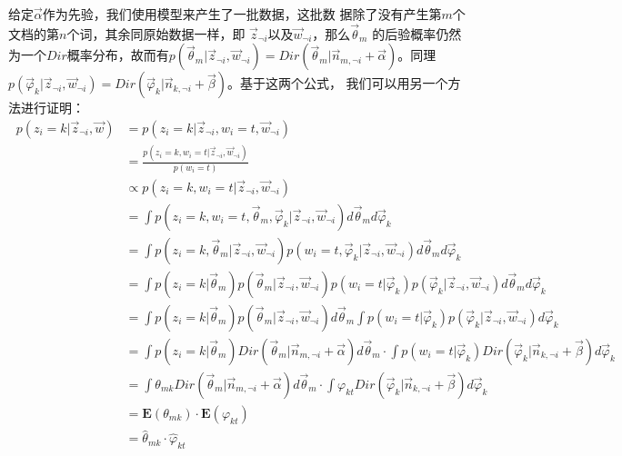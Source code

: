 给定$\vec{\alpha}$作为先验，我们使用模型来产生了一批数据，这批数
据除了没有产生第$m$个文档的第$n$个词，其余同原始数据一样，即
$\vec{z}_{\neg i}$以及$\vec{w}_{\neg i}$，那么$\vec{\theta}_m$
的后验概率仍然为一个$Dir$概率分布，故而有$p(\vec{\theta}_m|\vec{z}_{\neg i}, \vec{w}_{\neg i}) = Dir(\vec{\theta}_m|\vec{n}_{m, \neg i} + \vec{\alpha})$。同理
$p(\vec{\varphi}_k|\vec{z}_{\neg i}, \vec{w}_{\neg i}) =
Dir(\vec{\varphi}_k|\vec{n}_{k, \neg i}+\vec{\beta})$。基于这两个公式，
我们可以用另一个方法进行证明：
\begin{displaymath}
\begin{split}\
p(z_i=k|\vec{z}_{\neg i}, \vec{w})  
&= p(z_i=k|\vec{z}_{\neg i},w_i=t, \vec{w}_{\neg i})  \\
&=\frac{p(z_i=k, w_i=t|\vec{z}_{\neg i}, \vec{w}_{\neg i})}{p(w_i = t)}\\
&\propto
p(z_i=k,w_i=t|\vec{z}_{\neg i}, \vec{w}_{\neg i})\\
&=\int{p(z_i=k, w_i=t, \vec{\theta}_m, \vec{\varphi}_k|\vec{z}_{\neg i},
\vec{w}_{\neg i})}d\vec{\theta}_md\vec{\varphi}_k\\
&=\int{p(z_i=k, \vec{\theta}_m|\vec{z}_{\neg i},
\vec{w}_{\neg i})
p(w_i=t, \vec{\varphi}_k|\vec{z}_{\neg i},
\vec{w}_{\neg i})}d\vec{\theta}_md\vec{\varphi}_k\\
&=\int{p(z_i=k|\vec{\theta}_m)
p(\vec{\theta}_m|\vec{z}_{\neg i}, \vec{w}_{\neg i})
p(w_i=t| \vec{\varphi}_k)
p(\vec{\varphi}_k|\vec{z}_{\neg i}, \vec{w}_{\neg i})
}d\vec{\theta}_md\vec{\varphi}_k\\
&=\int{p(z_i=k|\vec{\theta}_m)
p(\vec{\theta}_m|\vec{z}_{\neg i}, \vec{w}_{\neg i})
}d\vec{\theta}_m
\int{p(w_i=t| \vec{\varphi}_k)
p(\vec{\varphi}_k|\vec{z}_{\neg i}, \vec{w}_{\neg i})
}d\vec{\varphi}_k\\
&=\int{p(z_i=k|\vec{\theta}_m)
Dir(\vec{\theta}_m|\vec{n}_{m, \neg i} + \vec{\alpha})
}d\vec{\theta}_m 
 \cdot \int{
p(w_i=t| \vec{\varphi}_k)
Dir(\vec{\varphi}_k|\vec{n}_{k, \neg i}+\vec{\beta})
}d\vec{\varphi}_k\\
&=\int{\theta_{mk}
Dir(\vec{\theta}_m|\vec{n}_{m, \neg i} + \vec{\alpha})
}d\vec{\theta}_m  \cdot \int{
\varphi_{kt}
Dir(\vec{\varphi}_k|\vec{n}_{k, \neg i}+\vec{\beta})
}d\vec{\varphi}_k\\
&= \mathbf{E}(\theta_{mk}) \cdot \mathbf{E}(\varphi_{kt})\\
&= \hat{\theta}_{mk} \cdot \hat{\varphi}_{kt}
\end{split}
\end{displaymath}


